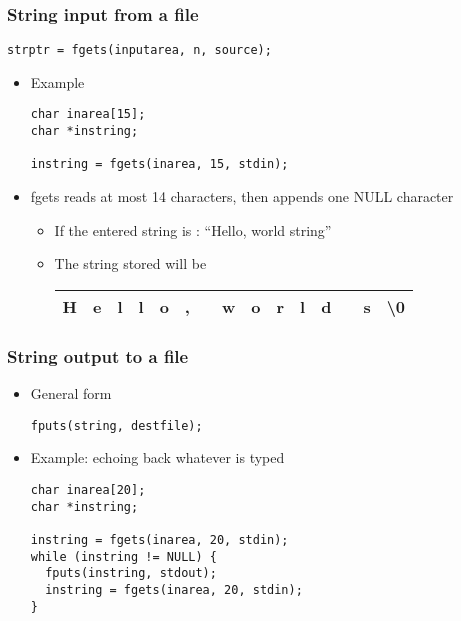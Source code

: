 \documentclass[11pt]{beamer}
\begin{document}
\begin{frame}[fragile]\frametitle{String input from a file}
\label{sec-1-18}


\begin{verbatim}
strptr = fgets(inputarea, n, source);
\end{verbatim}
\begin{itemize}
\item Example

\begin{verbatim}
char inarea[15];
char *instring;

instring = fgets(inarea, 15, stdin);
\end{verbatim}
\item fgets reads at most 14 characters, then appends one NULL character
\begin{itemize}
\item If the entered string is : ``Hello, world string''
\item The string stored will be

\begin{center}
\begin{tabular}{|c|c|c|c|c|c|c|c|c|c|c|c|c|c|c|}
\hline
 H  &  e  &  l  &  l  &  o  &  ,  &     &  w  &  o  &  r  &  l  &  d  &     &  s  &  \textbackslash 0  \\
\hline
\end{tabular}
\end{center}


\end{itemize}
\end{itemize}
\end{frame}
\begin{frame}[fragile]\frametitle{String output to a file}
\label{sec-1-19}

\begin{itemize}
\item General form

\begin{verbatim}
fputs(string, destfile);
\end{verbatim}
\item Example: echoing back whatever is typed

\begin{verbatim}
char inarea[20];
char *instring;

instring = fgets(inarea, 20, stdin);
while (instring != NULL) {
  fputs(instring, stdout);
  instring = fgets(inarea, 20, stdin);
}
\end{verbatim}
\end{itemize}
\end{frame}
\end{document}
